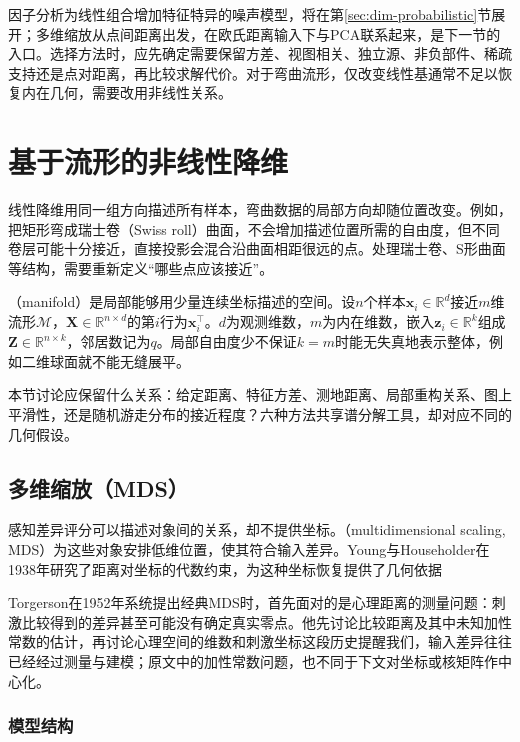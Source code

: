因子分析为线性组合增加特征特异的噪声模型，将在第\ref{sec:dim-probabilistic}节展开；多维缩放从点间距离出发，在欧氏距离输入下与PCA联系起来，是下一节的入口。选择方法时，应先确定需要保留方差、视图相关、独立源、非负部件、稀疏支持还是点对距离，再比较求解代价。对于弯曲流形，仅改变线性基通常不足以恢复内在几何，需要改用非线性关系。

\section{基于流形的非线性降维}
\label{sec:dim-manifold}

线性降维用同一组方向描述所有样本，弯曲数据的局部方向却随位置改变。例如，把矩形弯成瑞士卷（Swiss roll）曲面，不会增加描述位置所需的自由度，但不同卷层可能十分接近，直接投影会混合沿曲面相距很远的点。处理瑞士卷、S形曲面等结构，需要重新定义“哪些点应该接近”。

（manifold）是局部能够用少量连续坐标描述的空间。设$n$个样本$\bm{x}_i\in\mathbb{R}^d$接近$m$维流形$\mathcal{M}$，$\bm{X}\in\mathbb{R}^{n\times d}$的第$i$行为$\bm{x}_i^\top$。$d$为观测维数，$m$为内在维数，嵌入$\bm{z}_i\in\mathbb{R}^k$组成$\bm{Z}\in\mathbb{R}^{n\times k}$，邻居数记为$q$。局部自由度少不保证$k=m$时能无失真地表示整体，例如二维球面就不能无缝展平。

本节讨论应保留什么关系：给定距离、特征方差、测地距离、局部重构关系、图上平滑性，还是随机游走分布的接近程度？六种方法共享谱分解工具，却对应不同的几何假设。

\subsection{多维缩放（MDS）}
\label{sec:dim-mds}

感知差异评分可以描述对象间的关系，却不提供坐标。（multidimensional scaling, MDS）为这些对象安排低维位置，使其符合输入差异。Young与Householder在1938年研究了距离对坐标的代数约束，为这种坐标恢复提供了几何依据

Torgerson在1952年系统提出经典MDS时，首先面对的是心理距离的测量问题：刺激比较得到的差异甚至可能没有确定真实零点。他先讨论比较距离及其中未知加性常数的估计，再讨论心理空间的维数和刺激坐标这段历史提醒我们，输入差异往往已经经过测量与建模；原文中的加性常数问题，也不同于下文对坐标或核矩阵作中心化。

\subsubsection{模型结构}

